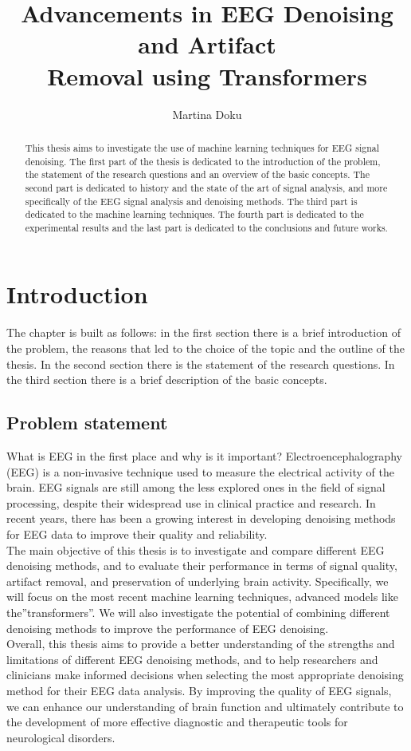 \documentclass[a4paper]{sapthesis}
\title{Advancements in EEG Denoising and Artifact\\ Removal using Transformers}
\author{Martina Doku}
\begin{document}
\maketitle
\dedication{dedication}
\begin{abstract}
This thesis aims to investigate the use of machine learning
 techniques for EEG signal denoising. The first part of the
thesis is dedicated to the introduction of the problem, the statement
of the research questions and an overview of the basic concepts.
The second part is dedicated to history and 
the state of
the art of signal analysis, and more specifically of the EEG signal
analysis and denoising methods. The third part is dedicated to the
 machine learning techniques.
The fourth part is dedicated to the experimental results and the last part
is dedicated to the conclusions and future works.
\end{abstract}
\tableofcontents
\chapter{Introduction}
The chapter is built as follows: in the first section there is a brief
introduction of the problem, the reasons that led to the choice of the
topic and the outline of the thesis. In the second section there is the
statement of the research questions. In the third section there is a brief
description of the basic concepts.
\section{Problem statement}
What is EEG in the first place and why is it important? Electroencephalography 
(EEG) is a non-invasive technique used to measure the electrical activity of
the brain. EEG signals are still among the less explored ones in the
field of signal processing, despite their widespread use in clinical 
practice and research. In recent years, there has been a growing 
interest in developing denoising methods for EEG data to improve their 
quality and reliability.\newline \\
The main objective of this thesis is to investigate and compare different
 EEG denoising methods, and to evaluate their performance in terms of 
 signal quality, artifact removal, and preservation of underlying brain
activity. Specifically, we will focus on the most recent machine learning
techniques, advanced models like the''transformers''. We will also investigate the 
potential of combining different denoising methods to improve the 
performance of EEG denoising.\newline \\
Overall, this thesis aims to provide a better understanding of the strengths
 and limitations of different EEG denoising methods, and to help researchers
  and clinicians make informed decisions when selecting the most appropriate
   denoising method for their EEG data analysis. By improving the quality of
    EEG signals, we can enhance our understanding of brain function and 
    ultimately contribute to the development of more effective diagnostic 
    and therapeutic tools for neurological disorders.
\end{document}
